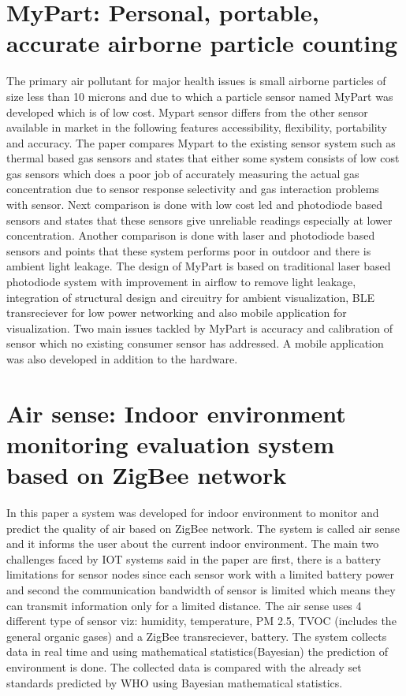 \documentclass[11pt]{article}
\begin{document}
\section{MyPart: Personal, portable, accurate airborne particle counting}\cite{Tian2016}

The primary air pollutant for major health issues is small airborne particles of size less than 10 microns and due to which a particle sensor named MyPart was developed which is of low cost. Mypart sensor differs from the other sensor available in market in the following features accessibility, flexibility, portability and accuracy. The paper compares Mypart to the existing sensor system such as thermal based gas sensors and states that either some system consists of low cost gas sensors which does a poor job of accurately measuring the actual gas concentration due to sensor response selectivity and gas interaction problems with sensor. Next comparison is done with low cost led and photodiode based sensors and states that these sensors give unreliable readings especially at lower concentration. Another comparison is done with laser and photodiode based sensors and points that these system performs poor in outdoor and there is ambient light leakage. The design of MyPart is based on traditional laser based photodiode system with improvement in airflow to remove light leakage, integration of structural design and circuitry for ambient visualization, BLE transreciever for low power networking and also mobile application for visualization. Two main issues tackled by MyPart is accuracy and calibration of sensor which no existing consumer sensor has addressed. A mobile application was also developed in addition to the hardware.

\section{Air sense: Indoor environment monitoring evaluation system based on ZigBee network} \cite{Liu2017}

In this paper a system was developed for indoor environment to monitor and predict the quality of air based on ZigBee network. The system is called air sense and it informs the user about the current indoor environment. The main two challenges faced by IOT systems said in the paper are first, there is a battery limitations for sensor nodes since each sensor work with a limited battery power and second the communication bandwidth of sensor is limited which means they can transmit information only for a limited distance. The air sense uses 4 different type of sensor viz: humidity, temperature, PM 2.5, TVOC (includes the general organic gases) and a ZigBee transreciever, battery. The system collects data in real time and using mathematical statistics(Bayesian) the prediction of environment is done. The collected data is compared with the already set standards predicted by WHO using Bayesian mathematical statistics.
\end{document}
